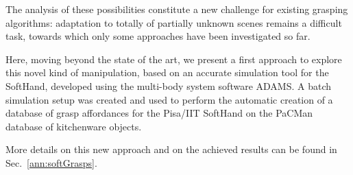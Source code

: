 The analysis of these possibilities constitute a new challenge for existing grasping algorithms: adaptation to totally of partially unknown scenes remains a difficult task, towards which only some approaches have been investigated so far.

Here, moving beyond the state of the art, we present a first approach to explore this novel kind of manipulation, based on an accurate simulation tool for the SoftHand, developed using the multi-body system software ADAMS. A batch simulation setup was created and used to perform the automatic creation of a database of grasp affordances for the Pisa/IIT SoftHand on the PaCMan database of kitchenware objects.

More details on this new approach and on the achieved results can be found in Sec.~\ref{ann:softGrasps}. %